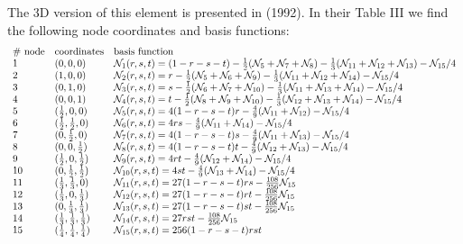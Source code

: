 The 3D version of this element is presented in \textcite{begt92} (1992). 
In their Table III we find the following node coordinates and basis functions:
\[
\begin{array}{lll}
\text{\# node} & \text{coordinates} & \text{basis function} \\
1  & (0,0,0) & {\mathcal{N}}_1(r,s,t)=(1-r-s-t) -\frac12 ({\mathcal{N}}_5+{\mathcal{N}}_7+{\mathcal{N}}_8)-\frac13({\mathcal{N}}_{11}+{\mathcal{N}}_{12}+{\mathcal{N}}_{13})-{\mathcal{N}}_{15}/4 \\ 
2  & (1,0,0) & {\mathcal{N}}_2(r,s,t)=r-\frac12({\mathcal{N}}_5+{\mathcal{N}}_6+{\mathcal{N}}_9)    -\frac13({\mathcal{N}}_{11}+{\mathcal{N}}_{12}+{\mathcal{N}}_{14}) -{\mathcal{N}}_{15}/4 \\
3  & (0,1,0) & {\mathcal{N}}_3(r,s,t)=s-\frac12({\mathcal{N}}_6+{\mathcal{N}}_7+{\mathcal{N}}_{10}) -\frac13({\mathcal{N}}_{11}+{\mathcal{N}}_{13}+{\mathcal{N}}_{14}) -{\mathcal{N}}_{15}/4 \\
4  & (0,0,1) & {\mathcal{N}}_4(r,s,t)=t-\frac12({\mathcal{N}}_8+{\mathcal{N}}_9+{\mathcal{N}}_{10}) -\frac13({\mathcal{N}}_{12}+{\mathcal{N}}_{13}+{\mathcal{N}}_{14}) -{\mathcal{N}}_{15}/4 \\
5  & (\frac12,0,0)             &  {\mathcal{N}}_5(r,s,t)=4(1-r-s-t)r-\frac49({\mathcal{N}}_{11}+{\mathcal{N}}_{12})-{\mathcal{N}}_{15}/4  \\
6  & (\frac12,\frac12,0)       &  {\mathcal{N}}_6(r,s,t)=4rs-\frac49({\mathcal{N}}_{11}+{\mathcal{N}}_{14})-{\mathcal{N}}_{15}/4  \\
7  & (0,\frac12,0)             &  {\mathcal{N}}_7(r,s,t)=4(1-r-s-t)s-\frac49({\mathcal{N}}_{11}+{\mathcal{N}}_{13})-{\mathcal{N}}_{15}/4  \\
8  & (0,0,\frac12)             &  {\mathcal{N}}_8(r,s,t)=4(1-r-s-t)t-\frac49({\mathcal{N}}_{12}+{\mathcal{N}}_{13})-{\mathcal{N}}_{15}/4  \\
9  & (\frac12,0,\frac12)       &  {\mathcal{N}}_9(r,s,t)=4rt-\frac49({\mathcal{N}}_{12}+{\mathcal{N}}_{14})-{\mathcal{N}}_{15}/4  \\
10 & (0,\frac12,\frac12)       &  {\mathcal{N}}_{10}(r,s,t)= 4st-\frac49({\mathcal{N}}_{13}+{\mathcal{N}}_{14})-{\mathcal{N}}_{15}/4 \\
11 & (\frac13,\frac13,0)       &  {\mathcal{N}}_{11}(r,s,t)= 27(1-r-s-t)rs-\frac{108}{256}{\mathcal{N}}_{15} \\
12 & (\frac13,0,\frac13)       &  {\mathcal{N}}_{12}(r,s,t)= 27(1-r-s-t)rt-\frac{108}{256}{\mathcal{N}}_{15} \\
13 & (0,\frac13,\frac13)       &  {\mathcal{N}}_{13}(r,s,t)= 27(1-r-s-t)st-\frac{108}{256}{\mathcal{N}}_{15} \\
14 & (\frac13,\frac13,\frac13) &  {\mathcal{N}}_{14}(r,s,t)= 27rst-\frac{108}{256}{\mathcal{N}}_{15} \\
15 & (\frac14,\frac14,\frac14) &  {\mathcal{N}}_{15}(r,s,t)= 256(1-r-s-t)rst \\
\end{array}
\]

